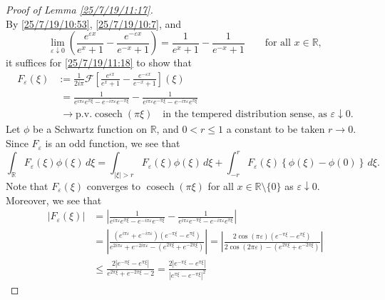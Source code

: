 \documentclass{amsart}
\numberwithin{equation}{section}
\newcommand{\pv}{\textrm{p.v.}}
\begin{document}
\begin{proof}[Proof of Lemma \ref{25/7/19/11:17}]
\begin{equation}
\end{equation}
By \eqref{25/7/19/10:53}, \eqref{25/7/19/10:7}, and  
\[ \lim_{\varepsilon \downarrow 0}\left( \frac{e^{\varepsilon x}}{e^{x}+1}-\frac{e^{-\varepsilon x}}{e^{-x}+1}\right) =\frac{1}{e^{x}+1} -\frac{1}{e^{-x}+1}\qquad \mbox{for all $x\in \mathbb{R}$}, \]
it suffices for \eqref{25/7/19/11:18} to show that 
\begin{equation}\label{25/7/19/11:25}
\begin{aligned}
F_{\varepsilon}(\xi)
&:= \frac{1}{2i \pi}\mathcal{F}\left[\frac{e^{\varepsilon x}}{e^{x}+1}- \frac{e^{-\varepsilon x}}{e^{-x}+1}\right](\xi) \\
&\;=\frac{1}{e^{i \pi \varepsilon} e^{\pi \xi }-e^{-i \pi \varepsilon}e^{-\pi \xi}}-\frac{1}{e^{i\pi \varepsilon}e^{-\pi \xi}-e^{-i\pi\varepsilon }e^{\pi \xi}} \\
&\;\to \pv \operatorname{cosech}{(\pi \xi)}\quad \mbox{in the tempered distribution sense, as $\varepsilon \downarrow 0$}. 
\end{aligned}
\end{equation}
Let $\phi$ be a Schwartz function on $\mathbb{R}$, and $0< r \leq 1$ a constant to be taken $r\to 0$. 
Since $F_{\varepsilon}$ is an odd function, we see that 
\begin{equation}\label{25/7/19/11:39}
\int_{\mathbb{R}} F_{\varepsilon}(\xi) \phi(\xi) \,d\xi 
=\int_{|\xi|>r} F_{\varepsilon}(\xi) \phi(\xi) \,d\xi +\int_{-r}^{r} F_{\varepsilon}(\xi) \left\{ \phi(\xi)-\phi(0)\right\} \,d\xi .
\end{equation}
Note that $F_{\varepsilon}(\xi)$ converges to $\operatorname{cosech}{(\pi \xi)}$ for all $x\in \mathbb{R}\setminus \{ 0\}$ as $\varepsilon \downarrow 0$. 
Moreover, we see that 
\begin{equation}\label{25/7/19/11:48}
\begin{aligned}
\left| F_{\varepsilon}(\xi) \right|
&=\left| \frac{1}{e^{i \pi \varepsilon} e^{\pi \xi }-e^{-i \pi \varepsilon}e^{-\pi \xi}}-\frac{1}{e^{i\pi \varepsilon}e^{-\pi \xi}-e^{- i\pi \varepsilon}e^{\pi \xi}}\right| \\
&=\left| \frac{(e^{i\pi \varepsilon} + e^{-i \pi \varepsilon}) (e^{-\pi \xi} - e^{\pi \xi})}{e^{2i \pi \varepsilon} +e^{-2i \pi \varepsilon} -( e^{2\pi \xi } + e^{-2\pi \xi})}\right| =\left| \frac{2 \cos{(\pi \varepsilon)}(e^{-\pi \xi} - e^{\pi \xi})}{2 \cos{(2 \pi \varepsilon)} - (e^{2\pi \xi } + e^{-2\pi \xi})}\right| \\
&\leq \frac{2 |e^{-\pi \xi} - e^{\pi \xi}|}{e^{2\pi \xi } + e^{-2\pi \xi} - 2}=\frac{2 |e^{-\pi \xi} - e^{\pi \xi}|}{|e^{\pi \xi } - e^{-\pi \xi}|^{2} 
}
\end{aligned}
\end{equation}
\end{proof}
\end{document}
